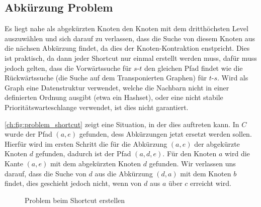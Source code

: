 \subsection{Abkürzung Problem}

Es liegt nahe als abgekürzten Knoten den Knoten mit dem dritthöchsten Level auszuwählen und sich darauf zu verlassen, dass die Suche von diesem Knoten aus die nächsen Abkürzung findet, da dies der Knoten-Kontraktion enstpricht.
Dies ist praktisch, da dann jeder Shortcut nur einmal erstellt werden muss, dafür muss jedoch gelten, dass die Vorwärtssuche für $s$-$t$ den gleichen Pfad findet wie die Rückwärtssuche (die Suche auf dem Transponierten Graphen) für $t$-$s$.
Wird als Graph eine Datenstruktur verwendet, welche die Nachbarn nicht in einer definierten Ordnung ausgibt (etwa ein Hashset), oder eine nicht stabile Prioritätswarteschlange verwendet, ist dies nicht garantiert.

\autoref{ch:fig:problem_shortcut} zeigt eine Situation, in der dies auftreten kann.
In $C$ wurde der Pfad $(a, e)$ gefunden, dess Abkürzungen jetzt ersetzt werden sollen.
Hierfür wird im ersten Schritt die für die Abkürzung $(a, e)$ der abgekürzte Knoten $d$ gefunden, dadurch ist der Pfad $(a, d, e)$.
Für den Knoten $a$ wird die Kante $(a, e)$ mit dem abgekürzten Knoten $d$ gefunden.
Wir verlassen uns darauf, dass die Suche von $d$ aus die Abkürzung $(d, a)$ mit dem Knoten $b$ findet, dies geschieht jedoch nicht, wenn von $d$ aus $a$ über $c$ erreicht wird.

\begin{figure}[h!]
  \centering

  \caption{Problem beim Shortcut erstellen}
  \label{ch:fig:problem_shortcut}
\end{figure}

